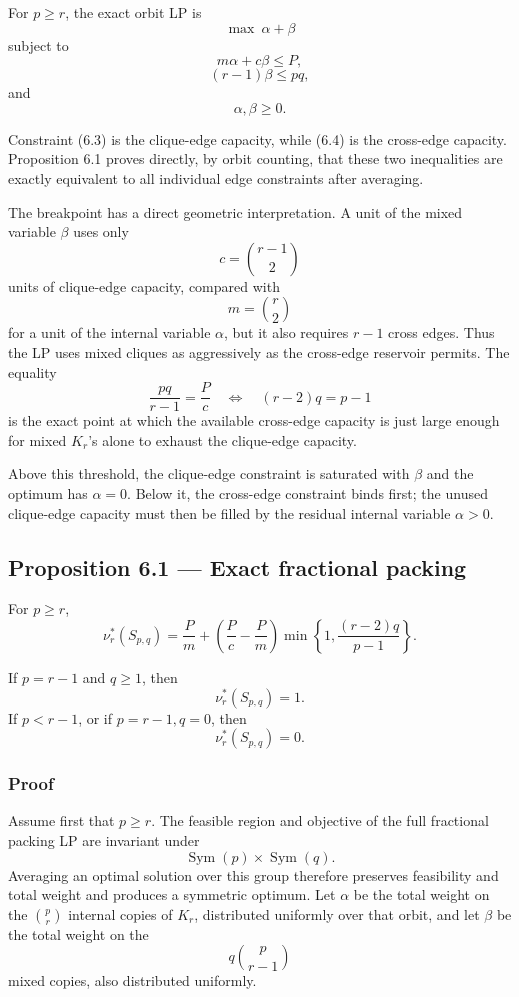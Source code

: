 \documentclass[11pt,a4paper]{article}
\begin{document}
For \(p\ge r\), the exact orbit LP is
\[
\max\ \alpha+\beta
\tag{6.2}
\]
subject to
\[
m\alpha+c\beta\le P,
\tag{6.3}
\]
\[
(r-1)\beta\le pq,
\tag{6.4}
\]
and
\[
\alpha,\beta\ge0.
\tag{6.5}
\]

Constraint (6.3) is the clique-edge capacity, while (6.4) is the
cross-edge capacity. Proposition 6.1 proves directly, by orbit counting,
that these two inequalities are exactly equivalent to all individual edge
constraints after averaging.

The breakpoint has a direct geometric interpretation. A unit of the mixed
variable \(\beta\) uses only
\[
c=\binom{r-1}{2}
\]
units of clique-edge capacity, compared with
\[
m=\binom r2
\]
for a unit of the internal variable \(\alpha\), but it also requires
\(r-1\) cross edges. Thus the LP uses mixed cliques as aggressively as the
cross-edge reservoir permits. The equality
\[
\frac{pq}{r-1}=\frac{P}{c}
\quad\Longleftrightarrow\quad
(r-2)q=p-1
\tag{6.6}
\]
is the exact point at which the available cross-edge capacity is just large
enough for mixed \(K_r\)'s alone to exhaust the clique-edge capacity.

Above this threshold, the clique-edge constraint is saturated with
\(\beta\) and the optimum has \(\alpha=0\). Below it, the cross-edge
constraint binds first; the unused clique-edge capacity must then be filled
by the residual internal variable \(\alpha>0\).

\subsection{Proposition 6.1 --- Exact fractional packing}\label{proposition-6.1-exact-fractional-packing}

For \(p\ge r\),
\[
\boxed{
\nu_r^*(S_{p,q})
=
\frac Pm
+
\left(\frac Pc-\frac Pm\right)
\min\left\{
1,\frac{(r-2)q}{p-1}
\right\}.
}
\tag{6.7}
\]

If \(p=r-1\) and \(q\ge1\), then
\[
\nu_r^*(S_{p,q})=1.
\tag{6.8}
\]
If \(p<r-1\), or if \(p=r-1,q=0\), then
\[
\nu_r^*(S_{p,q})=0.
\tag{6.9}
\]

\subsubsection{Proof}\label{proof-5}

Assume first that \(p\ge r\). The feasible region and objective of the
full fractional packing LP are invariant under
\[
\operatorname{Sym}(p)\times\operatorname{Sym}(q).
\]
Averaging an optimal solution over this group therefore preserves
feasibility and total weight and produces a symmetric optimum. Let
\(\alpha\) be the
total weight on the \(\binom pr\) internal copies of \(K_r\), distributed
uniformly over that orbit, and let \(\beta\) be the total weight on the
\[
q\binom p{r-1}
\]
mixed copies, also distributed uniformly.
\end{document}
